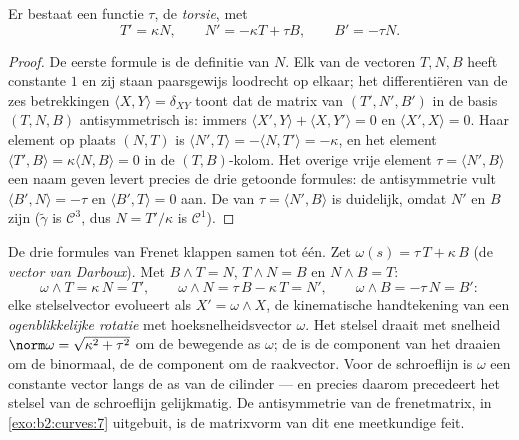 \begin{theorem}\label{thm:b2:curves:frenet3d}
Er bestaat een  functie $\tau$, de
\emph{torsie}, met
\[
T' = \kappa N, \qquad
N' = -\kappa T + \tau B, \qquad
B' = -\tau N .
\]
\end{theorem}

\begin{proof}
De eerste formule is de definitie van $N$. Elk van de vectoren $T,
N, B$ heeft constante  $1$ en zij staan paarsgewijs loodrecht
op elkaar; het differentiëren van de zes betrekkingen $\langle X,
Y\rangle = \delta_{XY}$ toont dat de matrix van $(T', N', B')$ in
de basis $(T, N, B)$ antisymmetrisch is: immers $\langle X',
Y\rangle + \langle X, Y'\rangle = 0$ en $\langle X', X\rangle = 0$.
Haar element op plaats $(N, T)$ is $\langle N', T\rangle = -\langle
N, T'\rangle = -\kappa$, en het element $\langle T', B\rangle =
\kappa\langle N, B\rangle = 0$ in de $(T, B)$-kolom. Het overige
vrije element $\tau = \langle N', B\rangle$ een naam geven levert
precies de drie getoonde formules: de antisymmetrie vult $\langle
B', N\rangle = -\tau$ en $\langle B', T\rangle = 0$ aan. De
 van $\tau = \langle N', B\rangle$ is duidelijk, omdat
$N'$ en $B$  zijn ($\tilde\gamma$ is $\mathcal{C}^3$, dus $N
= T'/\kappa$ is $\mathcal{C}^1$).
\end{proof}

\begin{example}\label{ex:b2:curves:darboux}
De drie formules van Frenet klappen samen tot één. Zet $\omega(s) =
\tau\,T + \kappa\,B$ (de \emph{vector van Darboux}). Met $B \wedge
T = N$, $T \wedge N = B$ en $N \wedge B = T$:
\[
\omega \wedge T = \kappa\,N = T', \qquad
\omega \wedge N = \tau\,B - \kappa\,T = N', \qquad
\omega \wedge B = -\tau\,N = B' :
\]
elke stelselvector evolueert als $X' = \omega \wedge X$, de
kinematische handtekening van een \emph{ogenblikkelijke rotatie}
met hoeksnelheidsvector $\omega$. Het stelsel draait met snelheid
$\norm\omega = \sqrt{\kappa^2 + \tau^2}$ om de bewegende as
$\omega$; de  is de component van het draaien om de
binormaal, de  de component om de raakvector. Voor de
schroeflijn is $\omega$ een constante vector langs de as van de
cilinder --- en precies daarom precedeert het stelsel van de
schroeflijn gelijkmatig. De antisymmetrie van de frenetmatrix, in
\cref{exo:b2:curves:7} uitgebuit, is de matrixvorm van dit ene
meetkundige feit.
\end{example}

